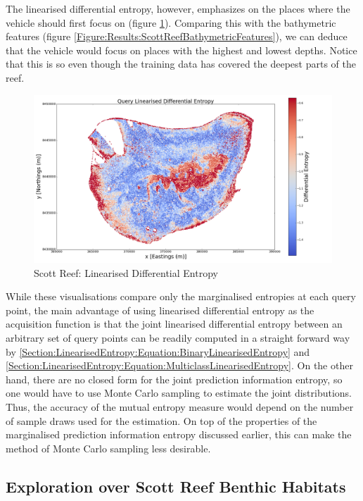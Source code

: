 \documentclass{article}
\begin{document}
		The linearised differential entropy, however, emphasizes on the places where the vehicle should first focus on (figure \ref{Figure:Results:ScottReefLinearisedDifferentialEntropy}). Comparing this with the bathymetric features (figure \ref{Figure:Results:ScottReefBathymetricFeatures}), we can deduce that the vehicle would focus on places with the highest and lowest depths. Notice that this is so even though the training data has covered the deepest parts of the reef.
		
		\begin{figure}[!htbp]
		\centering
			\includegraphics[width = \linewidth]{Figures/scott_reef_modeling/Figure11.png}
		\caption{Scott Reef: Linearised Differential Entropy}
		\label{Figure:Results:ScottReefLinearisedDifferentialEntropy}
		\end{figure}
	
		While these visualisations compare only the marginalised entropies at each query point, the main advantage of using linearised differential entropy as the acquisition function is that the joint linearised differential entropy between an arbitrary set of query points can be readily computed in a straight forward way by \eqref{Section:LinearisedEntropy:Equation:BinaryLinearisedEntropy} and \eqref{Section:LinearisedEntropy:Equation:MulticlassLinearisedEntropy}. On the other hand, there are no closed form for the joint prediction information entropy, so one would have to use Monte Carlo sampling to estimate the joint distributions. Thus, the accuracy of the mutual entropy measure would depend on the number of sample draws used for the estimation. On top of the properties of the marginalised prediction information entropy discussed earlier, this can make the method of Monte Carlo sampling less desirable.
			
	\subsection{Exploration over Scott Reef Benthic Habitats}
	
\end{document}
